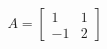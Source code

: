 \documentclass[preview]{standalone}
\begin{document}
\begin{align*}
A = \begin{bmatrix} 1 & 1 \\ -1 & 2 \end{bmatrix}
\end{align*}
\end{document}
